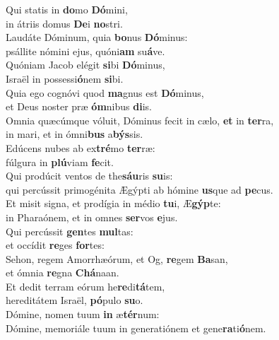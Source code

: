 \evenverse Qui statis in \textbf{do}mo \textbf{Dó}mini,~\*\\
\evenverse in átriis domus \textbf{De}i \textbf{no}stri.\\
\oddverse Laudáte Dóminum, quia \textbf{bo}nus \textbf{Dó}minus:~\*\\
\oddverse psállite nómini ejus, quóni\textbf{am} su\textbf{á}ve.\\
\evenverse Quóniam Jacob elégit \textbf{si}bi \textbf{Dó}minus,~\*\\
\evenverse Israël in possessi\textbf{ó}nem \textbf{si}bi.\\
\oddverse Quia ego cognóvi quod \textbf{ma}gnus est \textbf{Dó}minus,~\*\\
\oddverse et Deus noster præ \textbf{óm}nibus \textbf{di}is.\\
\evenverse Omnia quæcúmque vóluit, Dóminus fecit in cælo, \textbf{et} in \textbf{ter}ra,~\*\\
\evenverse in mari, et in ómni\textbf{bus} a\textbf{býs}sis.\\
\oddverse Edúcens nubes ab ex\textbf{tré}mo \textbf{ter}ræ:~\*\\
\oddverse fúlgura in \textbf{plú}viam \textbf{fe}cit.\\
\evenverse Qui prodúcit ventos de the\textbf{sáu}ris \textbf{su}is:~\*\\
\evenverse qui percússit primogénita Ægýpti ab hómine \textbf{us}que ad \textbf{pe}cus.\\
\oddverse Et misit signa, et prodígia in médio \textbf{tu}i, Æ\textbf{gýp}te:~\*\\
\oddverse in Pharaónem, et in omnes \textbf{ser}vos \textbf{e}jus.\\
\evenverse Qui percússit \textbf{gen}tes \textbf{mul}tas:~\*\\
\evenverse et occídit \textbf{re}ges \textbf{for}tes:\\
\oddverse Sehon, regem Amorrhæórum, et Og, \textbf{re}gem \textbf{Ba}san,~\*\\
\oddverse et ómnia \textbf{re}gna \textbf{Chá}naan.\\
\evenverse Et dedit terram eórum he\textbf{re}di\textbf{tá}tem,~\*\\
\evenverse hereditátem Israël, \textbf{pó}pulo \textbf{su}o.\\
\oddverse Dómine, nomen tuum \textbf{in} æ\textbf{tér}num:~\*\\
\oddverse Dómine, memoriále tuum in generatiónem et gene\textbf{ra}ti\textbf{ó}nem.\\
